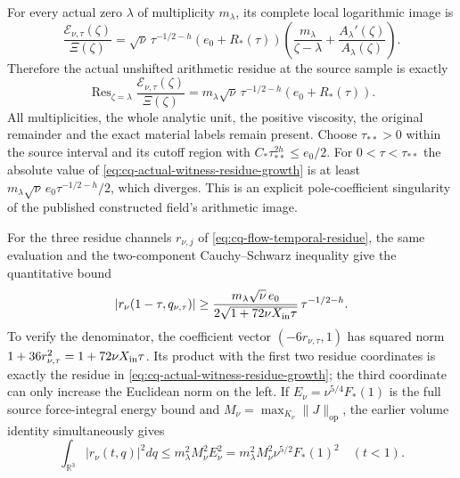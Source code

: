 For every actual zero $\lambda$ of multiplicity $m_\lambda$, its
complete local logarithmic image is
\begin{equation}
 \frac{\mathcal E_{\nu,\tau}(\zeta)}{\Xi(\zeta)}
 =\sqrt\nu\,\tau^{-1/2-h}(e_0+R_*(\tau))
     \left(\frac{m_\lambda}{\zeta-\lambda}
                    +\frac{A_\lambda'(\zeta)}{A_\lambda(\zeta)}\right).
 \label{eq:cq-actual-witness-meromorphic-defect}
\end{equation}
Therefore the actual unshifted arithmetic residue at the source
sample is exactly
\begin{equation}
 \operatorname{Res}_{\zeta=\lambda}
       \frac{\mathcal E_{\nu,\tau}(\zeta)}{\Xi(\zeta)}
 =m_\lambda\sqrt\nu\,\tau^{-1/2-h}
                           (e_0+R_*(\tau)).
 \label{eq:cq-actual-witness-residue-growth}
\end{equation}
All multiplicities, the whole analytic unit, the positive viscosity,
the original remainder and the exact material labels remain present.
Choose $\tau_{**}>0$ within the source interval and its cutoff region
with $C_*\tau_{**}^{2h}\leq e_0/2$. For $0<\tau<\tau_{**}$ the
absolute value of \eqref{eq:cq-actual-witness-residue-growth} is at
least $m_\lambda\sqrt\nu\,e_0\tau^{-1/2-h}/2$, which diverges.
This is an explicit pole-coefficient singularity of the published
constructed field's arithmetic image.

For the three residue channels $r_{\nu,j}$ of
\eqref{eq:cq-flow-temporal-residue}, the same evaluation and the
two-component Cauchy--Schwarz inequality give the quantitative bound
\begin{equation}
 |r_\nu(1-\tau,q_{\nu,\tau})|
 \geq
 \frac{m_\lambda\sqrt\nu\,e_0}
             {2\sqrt{1+72\nu X_{\rm in}\tau}}\,
                   \tau^{-1/2-h}.
 \label{eq:cq-actual-witness-residue-vector-growth}
\end{equation}
To verify the denominator, the coefficient vector
$(-6r_{\nu,\tau},1)$ has squared norm
$1+36r_{\nu,\tau}^2=1+72\nu X_{\rm in}\tau$.
Its product with the first two residue coordinates is exactly
the residue in \eqref{eq:cq-actual-witness-residue-growth}; the
third coordinate can only increase the Euclidean norm on the left.
If $E_\nu=\nu^{5/4}F_*(1)$ is the full source force-integral energy
bound and $M_\nu=\max_{K_\nu}\|J\|_{\mathrm{op}}$, the earlier
volume identity simultaneously gives
\[
 \int_{\mathbb R^3}|r_\nu(t,q)|^2dq
 \leq m_\lambda^2M_\nu^2E_\nu^2
 =m_\lambda^2M_\nu^2\nu^{5/2}F_*(1)^2\quad(t<1).
\]

